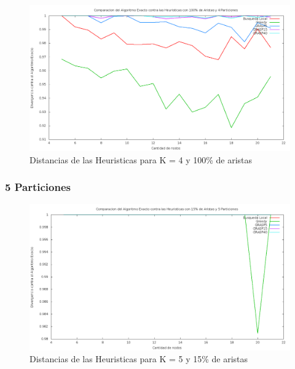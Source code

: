 \begin{figure}[H]
\begin{center}
\includegraphics[scale=0.3]{finales/ComparacionesCon4Particiones100Aristas.png}
\caption{Distancias de las Heuristicas para K = 4 y 100\% de aristas}
\end{center}
\end{figure}

\subsubsection{5 Particiones}

\begin{figure}[H]
\begin{center}
\includegraphics[scale=0.3]{finales/ComparacionesCon5Particiones15Aristas.png}
\caption{Distancias de las Heuristicas para K = 5 y 15\% de aristas}
\end{center}
\end{figure}

